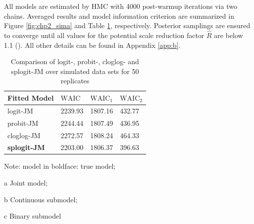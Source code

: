 All models are estimated by HMC with 4000 post-warmup iterations via two chains. Averaged results and model information criterion are summarized in Figure \ref{fig:chp2_sima} and Table \ref{tab:chp2_sima}, respectively. Posterior samplings are ensured to converge until all values for the potential scale reduction factor $\hat{R}$ are below 1.1 (\cite{Gelman1992}). All other details can be found in Appendix \ref{app:b}. 

\begin{center}
\begin{table}[H]
\caption{Comparison of logit-, probit-, cloglog- and splogit-JM over simulated data sets for 50 replicates}
\label{tab:chp2_sima}
 \centering
 \begin{threeparttable}
  \begin{tabular}{m{}m{}m{}m{}}
  \toprule
 Fitted Model & $\mbox{WAIC}$ \tnote{a} \hspace*{1.8mm} & $\mbox{WAIC}_1$ \tnote{b}  \hspace*{1.8mm}  & $\mbox{WAIC}_2$ \tnote{c}  \hspace*{1.8mm}\\
 \midrule
   logit-JM & 2239.93 & 1807.16 & 432.77 \\
  
   probit-JM & 2244.44 & 1807.49 & 436.95 \\
  
   cloglog-JM & 2272.57  & 1808.24 & 464.33 \\
   
   \bf splogit-JM & 2203.00 & 1806.37 & 396.63 \\
    \bottomrule
  \end{tabular}
   \begin{tablenotes}[para]
    \footnotesize
    Note: model in boldface: true model; \item[a] Joint model; \item[b] Continuous submodel; \item[c] Binary submodel
    \end{tablenotes}
    \end{threeparttable}
\end{table}
\end{center}

